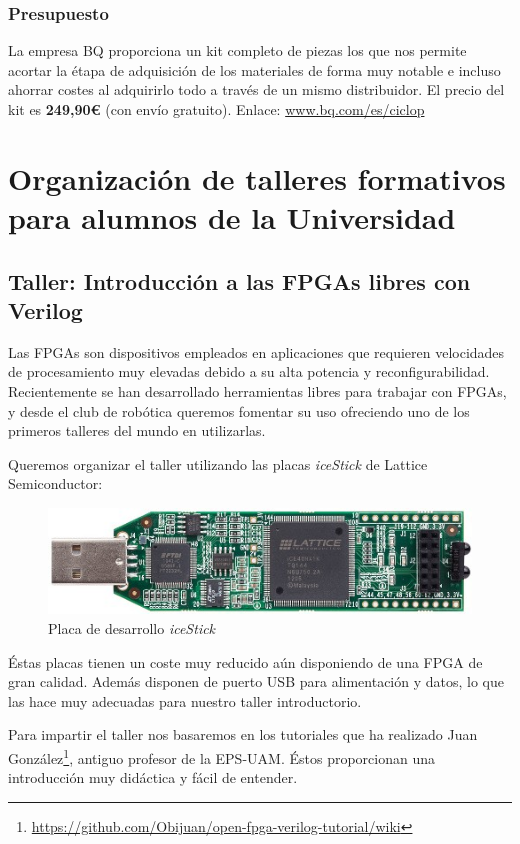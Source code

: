 \documentclass[12pt,twoside]{report}
\begin{document}
\subsubsection{Presupuesto}
La empresa BQ proporciona un kit completo de piezas los que nos permite acortar la étapa de adquisición de los materiales de forma muy notable e incluso ahorrar costes al adquirirlo todo a través de un mismo distribuidor.
El precio del kit es {\bf 249,90\euro{}} (con envío gratuito).
Enlace: \url{www.bq.com/es/ciclop}









\section{Organización de talleres formativos para alumnos de la Universidad}

\subsection{Taller: Introducción a las FPGAs libres con Verilog}
Las FPGAs son dispositivos empleados en aplicaciones que requieren velocidades de procesamiento muy elevadas debido a su alta potencia y reconfigurabilidad.
Recientemente se han desarrollado herramientas libres para trabajar con FPGAs, y desde el club de robótica queremos fomentar su uso ofreciendo uno de los primeros talleres del mundo en utilizarlas.

Queremos organizar el taller utilizando las placas \emph{iceStick} de Lattice Semiconductor:

\begin{figure}[hbtp]
\centerline{\includegraphics[width=0.75\linewidth]{fotos/icestick}}
\caption*{
Placa de desarrollo \emph{iceStick}
}
\end{figure}


Éstas placas tienen un coste muy reducido aún disponiendo de una FPGA de gran calidad. Además disponen de puerto USB para alimentación y datos, lo que las hace muy adecuadas para nuestro taller introductorio.

Para impartir el taller nos basaremos en los tutoriales que ha realizado Juan González\footnote{\url{https://github.com/Obijuan/open-fpga-verilog-tutorial/wiki}}, antiguo profesor de la EPS-UAM. Éstos proporcionan una introducción muy didáctica y fácil de entender.
\end{document}
